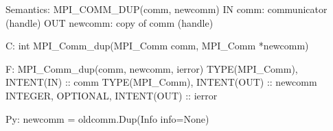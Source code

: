 Semantics:
MPI_COMM_DUP(comm, newcomm)
IN comm: communicator (handle)
OUT newcomm: copy of comm (handle)

C:
int MPI_Comm_dup(MPI_Comm comm, MPI_Comm *newcomm)

F:
MPI_Comm_dup(comm, newcomm, ierror)
TYPE(MPI_Comm), INTENT(IN) :: comm
TYPE(MPI_Comm), INTENT(OUT) :: newcomm
INTEGER, OPTIONAL, INTENT(OUT) :: ierror

Py:
newcomm = oldcomm.Dup(Info info=None)

